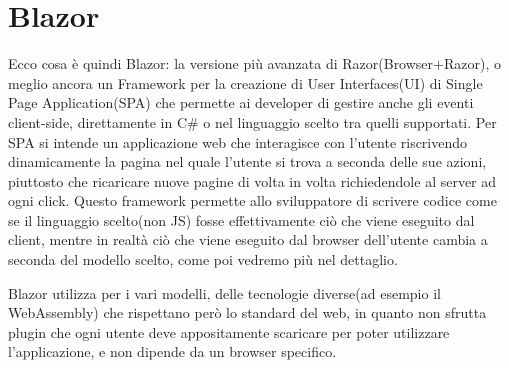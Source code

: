 \section{Blazor}
Ecco cosa \`e quindi Blazor: la versione pi\`u avanzata di Razor(Browser+Razor\cite{blazorWikiGitHub}), o meglio ancora un Framework per la creazione di User Interfaces(UI) di Single Page Application(SPA) che permette ai developer di gestire anche gli eventi client-side, direttamente in C\# o nel linguaggio scelto tra quelli supportati.
Per SPA si intende un applicazione web che interagisce con l'utente riscrivendo dinamicamente la pagina nel quale l'utente si trova a seconda delle sue azioni, piuttosto che ricaricare nuove pagine di volta in volta richiedendole al server ad ogni click\cite{SPA}.
Questo framework permette allo sviluppatore di scrivere codice come se il linguaggio scelto(non JS) fosse effettivamente ci\`o che viene eseguito dal client, mentre in realt\`a ci\`o che viene eseguito dal browser dell'utente cambia a seconda del modello scelto, come poi vedremo pi\`u nel dettaglio.

Blazor utilizza per i vari modelli, delle tecnologie diverse(ad esempio il WebAssembly) che rispettano per\`o lo standard del web, in quanto non sfrutta plugin che ogni utente deve appositamente scaricare per poter utilizzare l'applicazione, e non dipende da un browser specifico.